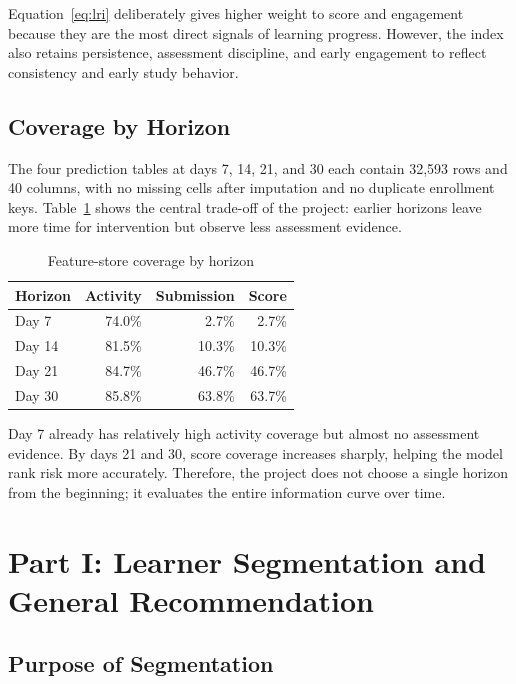 \documentclass[conference]{IEEEtran}
\begin{document}
Equation~\eqref{eq:lri} deliberately gives higher weight to score and engagement because they are the most direct signals of learning progress. However, the index also retains persistence, assessment discipline, and early engagement to reflect consistency and early study behavior.

\subsection{Coverage by Horizon}

The four prediction tables at days 7, 14, 21, and 30 each contain 32,593 rows and 40 columns, with no missing cells after imputation and no duplicate enrollment keys. Table~\ref{tab:horizon-coverage} shows the central trade-off of the project: earlier horizons leave more time for intervention but observe less assessment evidence.

\begin{table}[H]
\centering
\footnotesize
\caption{Feature-store coverage by horizon}
\label{tab:horizon-coverage}
\begin{tabular}{lrrr}
\toprule
Horizon & Activity & Submission & Score \\
\midrule
Day 7 & 74.0\% & 2.7\% & 2.7\% \\
Day 14 & 81.5\% & 10.3\% & 10.3\% \\
Day 21 & 84.7\% & 46.7\% & 46.7\% \\
Day 30 & 85.8\% & 63.8\% & 63.7\% \\
\bottomrule
\end{tabular}
\end{table}

Day 7 already has relatively high activity coverage but almost no assessment evidence. By days 21 and 30, score coverage increases sharply, helping the model rank risk more accurately. Therefore, the project does not choose a single horizon from the beginning; it evaluates the entire information curve over time.

\section{Part I: Learner Segmentation and General Recommendation}

\subsection{Purpose of Segmentation}
\end{document}

